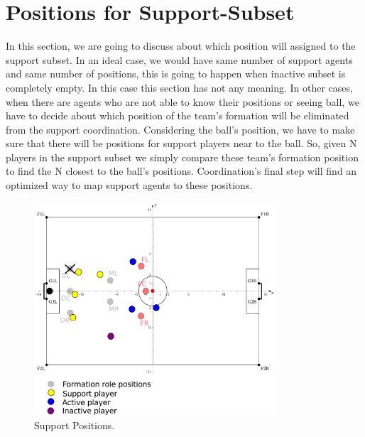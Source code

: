 \section{Positions for Support-Subset}
In this section, we are going to discuss about which position will assigned to the support subset. In an ideal case, we would have same number of support agents and same number of positions, this is going to happen when inactive subset is completely empty. In this case this section has not any meaning. In other cases, when there are agents who are not able to know their positions or seeing ball, we have to decide about which position of the team's formation will be eliminated from the support coordination. Considering the ball's position, we have to make sure that there will be positions for support players near to the ball. So, given N players in the support subset we simply compare these team's formation position to find the N closest to the ball's positions. Coordination's final step will find an optimized way to map support agents to these positions.
\begin{figure}[htb!]
\centering
  \includegraphics[width=0.8\textwidth]{Chapter4/figures/SupportPos.pdf}
  \caption{Support Positions.} 
  \label{fig:SupportPos}
\end{figure}

